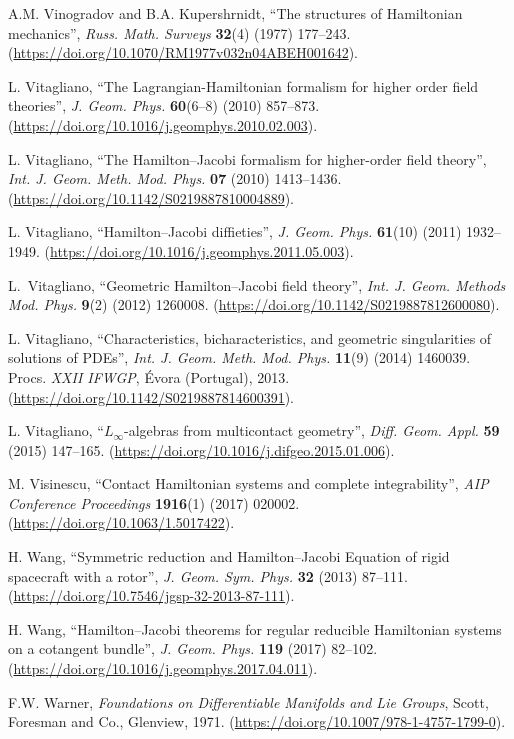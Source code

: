 \documentclass[12pt]{report}
\begin{document}
\begin{thebibliography}{999}
A.M. Vinogradov and B.A. Kupershrnidt,
 ``The structures of Hamiltonian mechanics'',
{\sl Russ. Math. Surveys} {\bf 32}(4) (1977) 177--243.
(\url{https://doi.org/10.1070/RM1977v032n04ABEH001642}).

L. Vitagliano, 
``The Lagrangian-Hamiltonian formalism for higher order field theories'',
{\sl J. Geom. Phys.} \textbf{60}(6--8) (2010) 857--873.
(\url{https://doi.org/10.1016/j.geomphys.2010.02.003}).

L. Vitagliano, ``The Hamilton--Jacobi formalism for higher-order field theory'', 
{\sl Int. J. Geom. Meth. Mod. Phys.} {\bf 07} (2010) 1413--1436.
\newblock (\url{https://doi.org/10.1142/S0219887810004889}).

L. Vitagliano, ``Hamilton--Jacobi diffieties'',
 {\sl J. Geom. Phys.} {\bf 61}(10) (2011) 1932--1949.
(\url{https://doi.org/10.1016/j.geomphys.2011.05.003}).

L.~{Vitagliano},
``Geometric {H}amilton--{J}acobi field theory'',
\textsl{Int. J. Geom. Methods Mod. Phys.} \textbf{9}(2) (2012) 1260008.
(\url{https://doi.org/10.1142/S0219887812600080}).

L. Vitagliano,
``Characteristics, bicharacteristics, and geometric singularities of solutions of PDEs'',
{\sl Int. J. Geom. Meth. Mod. Phys.} {\bf 11}(9) (2014)  1460039.
Procs. {\sl XXII IFWGP}, \'Evora (Portugal), 2013.
(\url{https://doi.org/10.1142/S0219887814600391}).

L. Vitagliano,
``$L_\infty$-algebras from multicontact geometry'',
{\sl Diff. Geom. Appl.} {\bf 59} (2015) 147--165.
(\url{https://doi.org/10.1016/j.difgeo.2015.01.006}).

M. Visinescu,
``Contact Hamiltonian systems and complete integrability'',
{\sl AIP Conference Proceedings} {\bf 1916}(1) (2017) 020002.
(\url{https://doi.org/10.1063/1.5017422}).

H. Wang,
``Symmetric reduction and Hamilton--Jacobi Equation of rigid spacecraft with a rotor'',
{\sl J. Geom. Sym. Phys.} {\bf 32} (2013) 87--111.
(\url{https://doi.org/10.7546/jgsp-32-2013-87-111}).

H. Wang,
``Hamilton--Jacobi theorems for regular reducible Hamiltonian systems on a cotangent bundle'',
{\sl J. Geom. Phys.} {\bf 119} (2017) 82--102.
(\url{https://doi.org/10.1016/j.geomphys.2017.04.011}).

F.W. Warner,
{\it Foundations on Differentiable Manifolds and Lie Groups},
Scott, Foresman and Co., Glenview, 1971.
(\url{https://doi.org/10.1007/978-1-4757-1799-0}).


\end{thebibliography}
\end{document}
